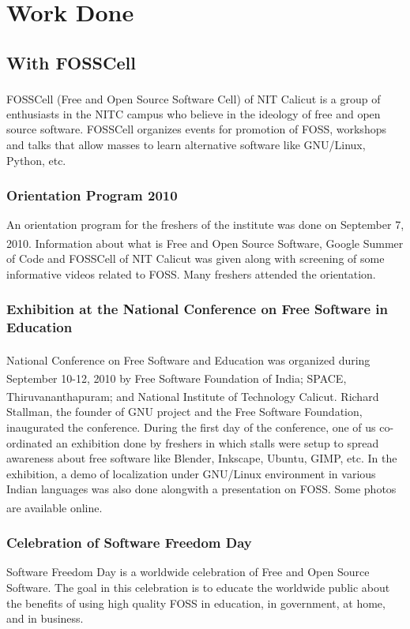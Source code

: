 \chapter{Work Done}

\section{With FOSSCell}
FOSSCell (Free and Open Source Software Cell)\textsuperscript{\cite{fosscell}} of NIT Calicut is a group of enthusiasts in the NITC campus who believe in the ideology of free and open source software. FOSSCell organizes events for promotion of FOSS, workshops and talks that allow masses to learn alternative software like GNU/Linux, Python, etc.

\subsection{Orientation Program 2010}
An orientation program for the freshers of the institute was done on September 7, 2010\textsuperscript{\cite{orientation}}. Information about what is Free and Open Source Software, Google Summer of Code and FOSSCell of NIT Calicut was given along with screening of some informative videos related to FOSS. Many freshers attended the orientation.

\subsection{Exhibition at the National Conference on Free Software in Education}
National Conference on Free Software and Education\textsuperscript{\cite{fsinedu}} was organized during September 10-12, 2010 by Free Software Foundation of India\textsuperscript{\cite{fsfi}}; SPACE, Thiruvananthapuram\textsuperscript{\cite{space}}; and National Institute of Technology Calicut. Richard Stallman, the founder of GNU project and the Free Software Foundation, inaugurated the conference. During the first day of the conference, one of us co-ordinated an exhibition done by freshers in which stalls were setup to spread awareness about free software like Blender, Inkscape, Ubuntu, GIMP, etc. In the exhibition, a demo of localization under GNU/Linux environment in various Indian languages was also done alongwith a presentation on FOSS. Some photos are available online\textsuperscript{\cite{fsinedupics}}.

\subsection{Celebration of Software Freedom Day}
Software Freedom Day is a worldwide celebration of Free and Open Source Software. The goal in this celebration is to educate the worldwide public about the benefits of using high quality FOSS in education, in government, at home, and in business.

